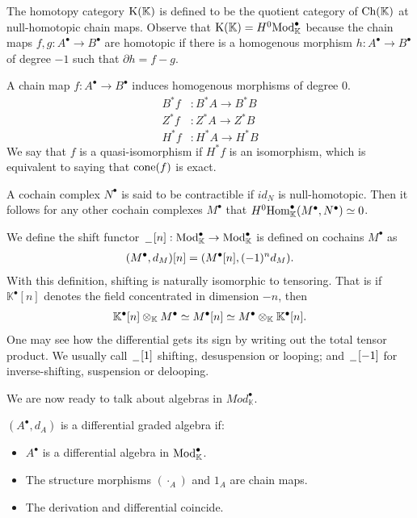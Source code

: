 \documentclass[../thesis.tex]{subfiles}
\begin{document}
            The homotopy category $\tt{K}(\mathbb{K})$ is defined to be the quotient category of $\tt{Ch}(\mathbb{K})$ at null-homotopic chain maps. Observe that $\tt{K}(\mathbb{K}) = H^0\tt{Mod}_\mathbb{K}^\bullet$ because the chain maps $f, g: A^\bullet \rightarrow B^\bullet$ are homotopic if there is a homogenous morphism $h: A^\bullet \rightarrow B^\bullet$ of degree $-1$ such that $\partial h = f - g$.

            A chain map $f: A^\bullet \rightarrow B^\bullet$ induces homogenous morphisms of degree $0$.
            \begin{align*}
                B^*f & : B^*A \rightarrow B^*B \\
                Z^*f & : Z^*A \rightarrow Z^*B \\
                H^*f & : H^*A \rightarrow H^*B
            \end{align*}
            We say that $f$ is a quasi-isomorphism if $H^*f$ is an isomorphism, which is equivalent to saying that $\tt{cone}(f)$ is exact.

            A cochain complex $N^\bullet$ is said to be contractible if $id_N$ is null-homotopic. Then it follows for any other cochain complexes $M^\bullet$ that $H^0\tt{Hom}_\mathbb{K}^\bullet(M^\bullet, N^\bullet) \simeq 0$.

            We define the shift functor $\argument [n] : \tt{Mod}_\mathbb{K}^\bullet \rightarrow \tt{Mod}_\mathbb{K}^\bullet$ is defined on cochains $M^\bullet$ as
            \begin{align*}
                (M^\bullet, d_M)[n] = (M^\bullet[n], (-1)^nd_M)\tt{.}
            \end{align*}
            With this definition, shifting is naturally isomorphic to tensoring. That is if $\mathbb{K}^\bullet[n]$ denotes the field concentrated in dimension $-n$, then
            \begin{align*}
                \mathbb{K}^\bullet[n]\otimes_\mathbb{K} M^\bullet \simeq M^\bullet[n]\simeq M^\bullet\otimes_\mathbb{K}\mathbb{K}^\bullet[n]\tt{.}
            \end{align*}
            One may see how the differential gets its sign by writing out the total tensor product. We usually call $\argument[1]$ shifting, desuspension or looping; and $\argument[-1]$ for inverse-shifting, suspension or delooping.

            We are now ready to talk about algebras in $Mod_\mathbb{K}^\bullet$.

            \begin{definition}
                $(A^\bullet,d_A)$ is a differential graded algebra if:
                \begin{itemize}
                    \item $A^\bullet$ is a differential algebra in $\tt{Mod}_\mathbb{K}^\bullet$.
                    \item The structure morphisms $(\cdot_A)$ and $1_A$ are chain maps.
                    \item The derivation and differential coincide.
                \end{itemize}
            \end{definition}
\end{document}
